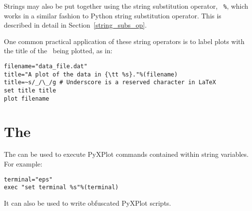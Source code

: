 Strings may also be put together using the string substitution operator, {\tt
\%}, which works in a similar fashion to
Python string substitution operator. This
is described in detail in Section~\ref{string_subs_op}.

One common practical application of these string operators is to label plots
with the title of the \datafile\ being plotted, as in:

\begin{verbatim}
filename="data_file.dat"
title="A plot of the data in {\tt %s}."%(filename)
title=~s/_/\_/g # Underscore is a reserved character in LaTeX
set title title
plot filename
\end{verbatim}

\section{The }

The  can be used to execute PyXPlot commands contained within
string variables. For example:

\begin{verbatim}
terminal="eps"
exec "set terminal %s"%(terminal)
\end{verbatim}

It can also be used to write obfuscated PyXPlot scripts.

